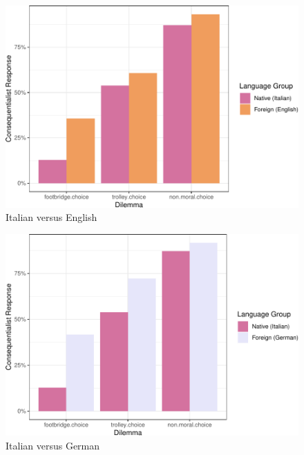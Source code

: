 \documentclass[
  man,floatsintext]{apa7}
\begin{document}
\begin{figure}
\centering
\includegraphics{FLDM_files/figure-latex/English-1.pdf}
\caption{\label{fig:English}Italian versus English}
\end{figure}

\begin{figure}
\centering
\includegraphics{FLDM_files/figure-latex/German-1.pdf}
\caption{\label{fig:German}Italian versus German}
\end{figure}
\end{document}
